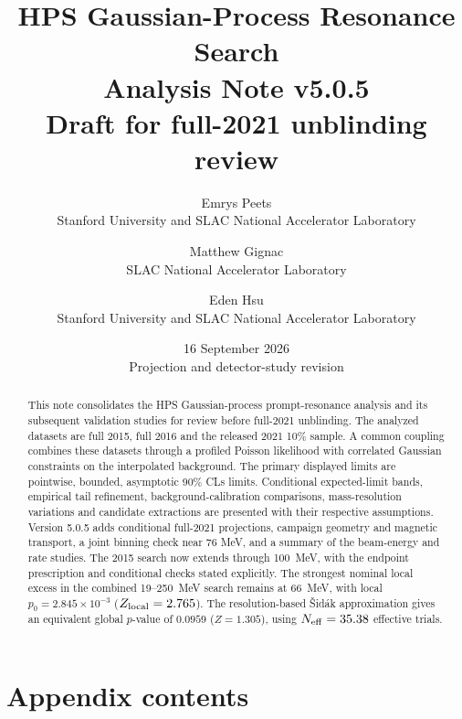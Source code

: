 \documentclass[11pt]{article}
\title{HPS Gaussian-Process Resonance Search\\[0.5em]
\large Analysis Note v5.0.5\\Draft for full-2021 unblinding review}
\author{Emrys Peets\\Stanford University and SLAC National Accelerator Laboratory
\and Matthew Gignac\\SLAC National Accelerator Laboratory
\and Eden Hsu\\Stanford University and SLAC National Accelerator Laboratory}
\date{16 September 2026\\\normalsize Projection and detector-study revision}
\makeatletter
\def\CLs{CLs}%
\newcommand{\CLs}{CL$_\mathrm{s}$}
\newcommand{\startappendixcontents}{%
\let\vfiveoriginaladdcontentsline\addcontentsline
\renewcommand{\addcontentsline}[3]{%
\vfiveoriginaladdcontentsline{##1}{##2}{##3}%
\def\vfivefirst{##1}\def\vfivetoc{toc}%
\ifx\vfivefirst\vfivetoc\vfiveoriginaladdcontentsline{apc}{##2}{##3}\fi}}
\newcommand{\appendixcontents}{\section*{Appendix contents}{\setcounter{tocdepth}{2}\@starttoc{apc}}}
\makeatother
\begin{document}
\maketitle
\begin{abstract}
This note consolidates the HPS Gaussian-process prompt-resonance analysis and
its subsequent validation studies for review before full-2021 unblinding.
The analyzed datasets are full 2015, full 2016 and the released 2021 10\% sample.
A common coupling combines these datasets through a profiled Poisson
likelihood with correlated Gaussian constraints on the interpolated background.
The primary displayed limits are pointwise, bounded, asymptotic 90\% \CLs{}
limits. Conditional expected-limit bands, empirical tail refinement,
background-calibration comparisons, mass-resolution variations and candidate
extractions are presented with their respective assumptions. Version 5.0.5
adds conditional full-2021 projections, campaign geometry and magnetic
transport, a joint binning check near 76 MeV, and a summary of the
beam-energy and rate studies.
The 2015 search now extends through 100~MeV, with the endpoint prescription
and conditional checks stated explicitly. The strongest nominal local excess
in the combined 19--250~MeV search remains at 66~MeV,
with local $p_0=2.845\times10^{-3}$ ($Z_{\rm local}=2.765$).
The resolution-based \v{S}id\'ak approximation gives an equivalent global
$p$-value of $0.0959$ ($Z=1.305$), using $N_{\rm eff}=35.38$ effective trials.
\end{abstract}
\clearpage{\small\tableofcontents}
\clearpage

\FloatBarrier\clearpage

\FloatBarrier\clearpage

\FloatBarrier\clearpage



\FloatBarrier\clearpage

\FloatBarrier\clearpage


\FloatBarrier\clearpage

\FloatBarrier\clearpage

\FloatBarrier\clearpage
\appendix
{}
\startappendixcontents

\FloatBarrier\clearpage
{\footnotesize\appendixcontents}
\clearpage

\FloatBarrier\clearpage

\FloatBarrier\clearpage

\FloatBarrier\clearpage

\FloatBarrier\clearpage

\FloatBarrier\clearpage

\FloatBarrier\clearpage

\clearpage

\clearpage

\FloatBarrier\clearpage

\FloatBarrier\clearpage

\FloatBarrier\clearpage

\FloatBarrier\clearpage

\FloatBarrier\clearpage

\FloatBarrier\clearpage
\let\addcontentsline\vfiveoriginaladdcontentsline


\end{document}

